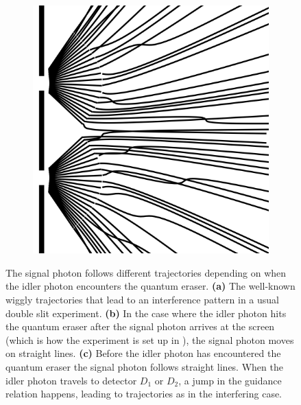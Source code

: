 \documentclass[12pt]{article}
\numberwithin{equation}{section}
\begin{document}
\begin{figure}[H]
\begin{subfigure}[b]{0.3\textwidth}
   				\caption{}
   				\label{fig:s2}
 		\end{subfigure}
		~
 		\begin{subfigure}[b]{0.3\textwidth}
   				\includegraphics[width=\textwidth]{eraser.png}
   				\caption{}
   				\label{fig:s3}
 		\end{subfigure}
 		
 
		\caption{The signal photon follows different trajectories depending on when the idler photon encounters the quantum eraser. \textbf{(a)} The well-known wiggly trajectories that lead to an interference pattern in a usual double slit experiment. \textbf{(b)} In the case where the idler photon hits the quantum eraser after the signal photon arrives at the screen (which is how the experiment is set up in \cite{Kim1999}), the signal photon moves on straight lines.  \textbf{(c)} Before the idler photon has encountered the quantum eraser the signal photon follows straight lines. When the idler photon travels to detector $D_1$ or $D_2$, a jump in the guidance relation happens, leading to trajectories as in the interfering case.}
		\label{fig:Doppelspalt}	
\end{figure} 
\end{document}
